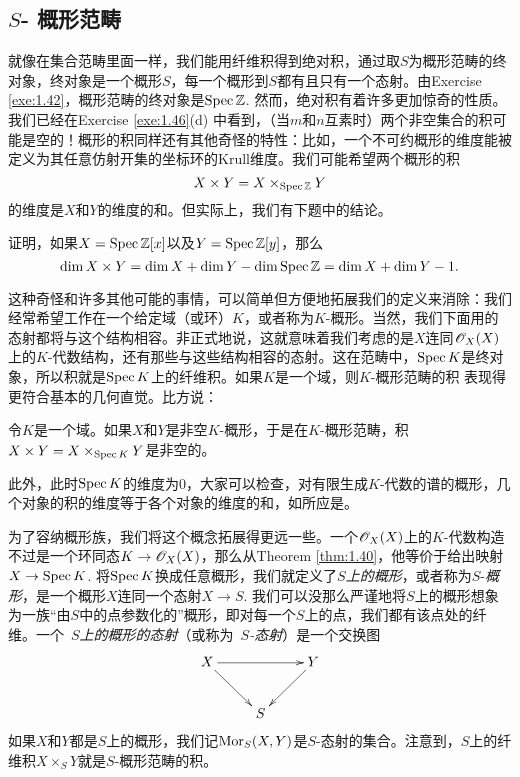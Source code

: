 \subsection{\texorpdfstring{$S$}{S}- 概形范畴}\label{s:1.3.2}

就像在集合范畴里面一样，我们能用纤维积得到绝对积，通过取$S$为概形范畴的终对象，终对象是一个概形$S$，每一个概形到$S$都有且只有一个态射。由Exercise \ref{exe:1.42}，概形范畴的终对象是$\operatorname{Spec} \mathbb{Z}$. 然而，绝对积有着许多更加惊奇的性质。我们已经在Exercise \ref{exe:1.46}(d) 中看到，（当$m$和$n$互素时）两个非空集合的积可能是空的！概形的积同样还有其他奇怪的特性：比如，一个不可约概形的维度能被定义为其任意仿射开集的坐标环的Krull维度。我们可能希望两个概形的积
\[
	X\times Y=X\times_{\operatorname{Spec} \mathbb{Z}} Y
\]
的维度是$X$和$Y$的维度的和。但实际上，我们有下题中的结论。

\begin{exe}\label{exe:1.48}
证明，如果$X=\operatorname{Spec} \mathbb{Z}[x]$以及$Y=\operatorname{Spec} \mathbb{Z}[y]$，那么
\[
	\dim X\times Y=\dim X+\dim Y-\dim \operatorname{Spec} \mathbb{Z}=\dim X+\dim Y-1.
\]
\end{exe}

这种奇怪和许多其他可能的事情，可以简单但方便地拓展我们的定义来消除：我们经常希望工作在一个给定域（或环）$K$，或者称为$K$-概形。当然，我们下面用的态射都将与这个结构相容。非正式地说，这就意味着我们考虑的是$X$连同$\mathscr{O}_X(X)$上的$K$-代数结构，还有那些与这些结构相容的态射。这在范畴中，$\operatorname{Spec} K$是终对象，所以积就是$\operatorname{Spec} K$上的纤维积。如果$K$是一个域，则$K$-概形范畴的积
表现得更符合基本的几何直觉。比方说：

\begin{exe}\label{exe:1.49}
令$K$是一个域。如果$X$和$Y$是非空$K$\hyp 概形，于是在$K$\hyp 概形范畴，积$X\times Y=X\times_{\operatorname{Spec} K}Y$是非空的。
\end{exe}

此外，此时$\operatorname{Spec} K$的维度为$0$，大家可以检查，对有限生成$K$-代数的谱的概形，几个对象的积的维度等于各个对象的维度的和，如所应是。

为了容纳概形族，我们将这个概念拓展得更远一些。一个$\mathscr{O}_X(X)$上的$K$-代数构造不过是一个环同态$K\to \mathscr{O}_X(X)$，那么从Theorem \ref{thm:1.40}，他等价于给出映射$X\to \operatorname{Spec} K$. 将$\operatorname{Spec} K$换成任意概形，我们就定义了$S$\textit{上的概形}，或者称为$S$-\textit{概形}，是一个概形$X$连同一个态射$X\to S$. 我们可以没那么严谨地将$S$上的概形想象为一族“由$S$中的点参数化的”概形，即对每一个$S$上的点，我们都有该点处的纤维。一个~\textit{$S$上的概形的态射}（或称为~\textit{$S$-态射}）是一个交换图
\[
	\xymatrix{
	X\ar[rr]\ar[rd]&&Y\ar[ld]\\
	&S&
	}
\]
如果$X$和$Y$都是$S$上的概形，我们记$\operatorname{Mor}_S(X,Y)$是$S$-态射的集合。注意到，$S$上的纤维积$X\times_S Y$就是$S$-概形范畴的积。


